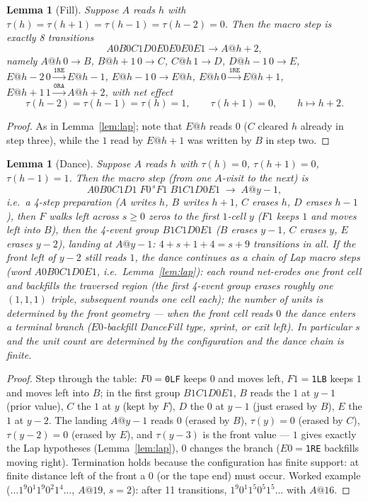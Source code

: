 \documentclass[11pt]{amsart}
\newtheorem{lemma}[theorem]{Lemma}
\begin{document}
\begin{lemma}[Fill]\label{lem:fill}
Suppose $A$ reads $h$ with $\tau(h)=\tau(h{+}1)=\tau(h{-}1)=\tau(h{-}2)=0$. Then the macro step is exactly 8 transitions
\[
A0B0C1D0E0E0E0E1 \to A@h{+}2,
\]
namely $A@h\,0{\to}B$, $B@h{+}1\,0{\to}C$, $C@h\,1{\to}D$, $D@h{-}1\,0{\to}E$, $E@h{-}2\,0{\xrightarrow{\texttt{1RE}}}E@h{-}1$, $E@h{-}1\,0{\to}E@h$, $E@h\,0{\xrightarrow{\texttt{1RE}}}E@h{+}1$, $E@h{+}1\,1{\xrightarrow{\texttt{0RA}}}A@h{+}2$, with net effect
\[
\tau(h{-}2)=\tau(h{-}1)=\tau(h)=1,\qquad \tau(h{+}1)=0,\qquad h\mapsto h+2 .
\]
\end{lemma}
\begin{proof}
As in Lemma~\ref{lem:lap}; note that $E@h$ reads $0$ ($C$ cleared $h$ already in step three), while the $1$ read by $E@h{+}1$ was written by $B$ in step two.
\end{proof}

\begin{lemma}[Dance]\label{lem:dance}
Suppose $A$ reads $h$ with $\tau(h)=0$, $\tau(h{+}1)=0$, $\tau(h{-}1)=1$. Then the macro step (from one $A$-visit to the next) is
\[
A0B0C1D1 \; F0^{\,s}F1 \; B1C1D0E1 \;\to\; A@y{-}1,
\]
i.e.\ a 4-step preparation ($A$ writes $h$, $B$ writes $h{+}1$, $C$ erases $h$, $D$ erases $h{-}1$), then $F$ walks left across $s\ge0$ zeros to the first $1$-cell $y$ ($F1$ keeps $1$ and moves left into $B$), then the 4-event group $B1C1D0E1$ ($B$ erases $y{-}1$, $C$ erases $y$, $E$ erases $y{-}2$), landing at $A@y{-}1$: $4+s+1+4=s+9$ transitions in all. If the front left of $y{-}2$ still reads $1$, the dance continues as a \emph{chain of Lap macro steps} (word $A0B0C1D0E1$, i.e.\ Lemma~\ref{lem:lap}): each round net-erodes one front cell and backfills the traversed region (the first 4-event group erases roughly one $(1,1,1)$ triple, subsequent rounds one cell each); the number of units is determined by the \emph{front geometry} --- when the front cell reads $0$ the dance enters a terminal branch ($E0$-backfill DanceFill type, sprint, or exit left). In particular $s$ and the unit count are determined by the configuration and the dance chain is finite.
\end{lemma}
\begin{proof}
Step through the table: $F0=$\texttt{0LF} keeps $0$ and moves left, $F1=$\texttt{1LB} keeps $1$ and moves left into $B$; in the first group $B1C1D0E1$, $B$ reads the $1$ at $y{-}1$ (prior value), $C$ the $1$ at $y$ (kept by $F$), $D$ the $0$ at $y{-}1$ (just erased by $B$), $E$ the $1$ at $y{-}2$. The landing $A@y{-}1$ reads $0$ (erased by $B$), $\tau(y)=0$ (erased by $C$), $\tau(y{-}2)=0$ (erased by $E$), and $\tau(y{-}3)$ is the front value --- $1$ gives exactly the Lap hypotheses (Lemma~\ref{lem:lap}), $0$ changes the branch ($E0{=}$\texttt{1RE} backfills moving right). Termination holds because the configuration has finite support: at finite distance left of the front a $0$ (or the tape end) must occur. Worked example ($\dots1^9 0^1 1^9 0^2 1^4\dots$, $A@19$, $s{=}2$): after 11 transitions, $1^9 0^1 1^5 0^5 1^5\dots$ with $A@16$.
\end{proof}
\end{document}
